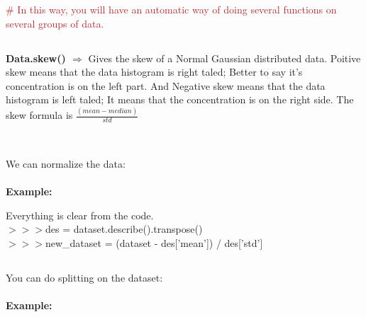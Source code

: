 \documentclass[a4paper,18pt]{article}
\begin{document}
{\textcolor{brown}{\# In this way, you will have an automatic way of doing several functions on several groups of data.}}\\



\subsection{\colorbox {matgreen}{\color{white}{\large Data.skew()}}}
\textbf{Data.skew() $\Rightarrow$} Gives the skew of a Normal Gaussian distributed data. Poitive skew means that the data histogram is right taled; Better to say it's concentration is on the left part. And Negative skew means that the data histogram is left taled; It means that the concentration is on the right side. The skew formula is $\frac{(mean-median)}{std}$\\\\


\subsection{\colorbox {matgreen}{\color{white}{\large Normalizing}}}
We can normalize the data:\\\\
\textbf{Example:\\}

Everything is clear from the code.\\

$>>>$des = dataset.describe().transpose()\\

$>>>$new\_dataset = (dataset - des['mean']) / des['std']


\subsection{\colorbox {matgreen}{\color{white}{\large Test,Train Split}}}
You can do splitting on the dataset:\\\\
\textbf{Example:\\}
\end{document}
